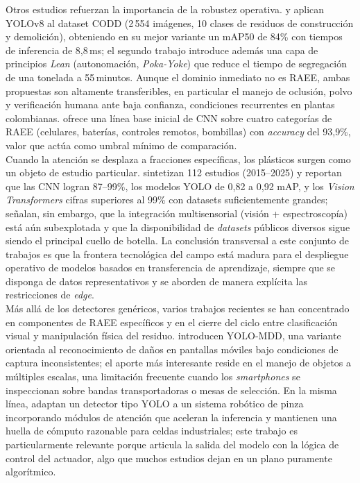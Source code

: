 Otros estudios refuerzan la importancia de la robustez operativa. \cite{dengVisionbasedDetectionSystem2026a} y \cite{khanLeanAIComputerVisionBasedTool2026} aplican YOLOv8 al dataset CODD (2\,554 imágenes, 10 clases de residuos de construcción y demolición), obteniendo en su mejor variante un mAP50 de 84\% con tiempos de inferencia de 8{,}8\,ms; el segundo trabajo introduce además una capa de principios \textit{Lean} (autonomación, \textit{Poka-Yoke}) que reduce el tiempo de segregación de una tonelada a 55\,minutos. Aunque el dominio inmediato no es RAEE, ambas propuestas son altamente transferibles, en particular el manejo de oclusión, polvo y verificación humana ante baja confianza, condiciones recurrentes en plantas colombianas. \cite{zhouMachineLearningClassification2022} ofrece una línea base inicial de CNN sobre cuatro categorías de RAEE (celulares, baterías, controles remotos, bombillas) con \textit{accuracy} del 93{,}9\%, valor que actúa como umbral mínimo de comparación.\\

Cuando la atención se desplaza a fracciones específicas, los plásticos surgen como un objeto de estudio particular. \cite{bhattaraiAIbasedPlasticWaste2026} sintetizan 112 estudios (2015--2025) y reportan que las CNN logran 87--99\%, los modelos YOLO de 0{,}82 a 0{,}92 mAP, y los \textit{Vision Transformers} cifras superiores al 99\% con datasets suficientemente grandes; señalan, sin embargo, que la integración multisensorial (visión + espectroscopía) está aún subexplotada y que la disponibilidad de \textit{datasets} públicos diversos sigue siendo el principal cuello de botella. La conclusión transversal a este conjunto de trabajos es que la frontera tecnológica del campo está madura para el despliegue operativo de modelos basados en transferencia de aprendizaje, siempre que se disponga de datos representativos y se aborden de manera explícita las restricciones de \textit{edge}.\\

Más allá de los detectores genéricos, varios trabajos recientes se han concentrado en componentes de RAEE específicos y en el cierre del ciclo entre clasificación visual y manipulación física del residuo. \cite{guYOLOMDDAddressingInconsistent2025} introducen YOLO-MDD, una variante orientada al reconocimiento de daños en pantallas móviles bajo condiciones de captura inconsistentes; el aporte más interesante reside en el manejo de objetos a múltiples escalas, una limitación frecuente cuando los \textit{smartphones} se inspeccionan sobre bandas transportadoras o mesas de selección. En la misma línea, \cite{wangImprovedYOLObasedWaste2023} adaptan un detector tipo YOLO a un sistema robótico de pinza incorporando módulos de atención que aceleran la inferencia y mantienen una huella de cómputo razonable para celdas industriales; este trabajo es particularmente relevante porque articula la salida del modelo con la lógica de control del actuador, algo que muchos estudios dejan en un plano puramente algorítmico.\\

